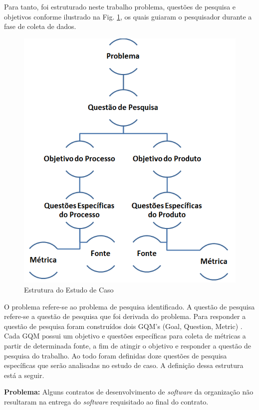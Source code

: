Para tanto, foi estruturado neste trabalho problema, questões de pesquisa e objetivos conforme ilustrado na Fig. \ref{estrutura}, os quais guiaram o pesquisador durante a fase de coleta de dados.

\begin{figure}[H]
		\centering
		
			\includegraphics[scale=1.0]{figuras/estruturaEstudo.png}
		\caption{Estrutura do Estudo de Caso}
		\label{estrutura}
	\end{figure}

O problema refere-se ao problema de pesquisa identificado. A questão de pesquisa refere-se a questão de pesquisa que foi derivada do problema. Para responder a questão de pesquisa foram construídos dois GQM's (Goal, Question, Metric) \cite{gqm}. Cada GQM possui um objetivo e questões específicas para coleta de métricas a partir de determinada fonte, a fim de atingir o objetivo e responder a questão de pesquisa do trabalho. Ao todo foram definidas doze questões de pesquisa específicas que serão analisadas no estudo de caso. A definição dessa estrutura está a seguir.

\textbf{Problema:} Alguns contratos de desenvolvimento de \textit{software} da organização não resultaram na entrega do \textit{software} requisitado ao final do contrato.

